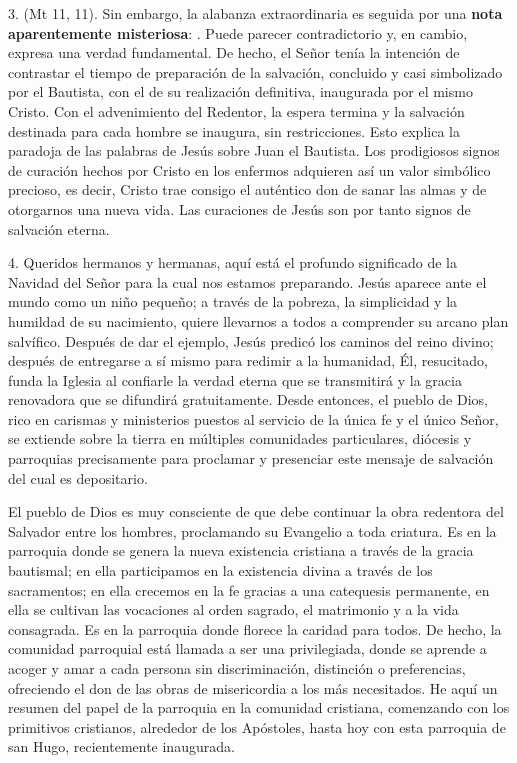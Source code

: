 3.  (Mt 11, 11). Sin embargo, la alabanza extraordinaria es seguida por una \textbf{nota aparentemente misteriosa}: . Puede parecer contradictorio y, en cambio, expresa una verdad fundamental. De hecho, el Señor tenía la intención de contrastar el tiempo de preparación de la salvación, concluido y casi simbolizado por el Bautista, con el de su realización definitiva, inaugurada por el mismo Cristo. Con el advenimiento del Redentor, la espera termina y la salvación destinada para cada hombre se inaugura, sin restricciones. Esto explica la paradoja de las palabras de Jesús sobre Juan el Bautista. Los prodigiosos signos de curación hechos por Cristo en los enfermos adquieren así un valor simbólico precioso, es decir, Cristo trae consigo el auténtico don de sanar las almas y de otorgarnos una nueva vida. Las curaciones de Jesús son por tanto signos de salvación eterna.

4. Queridos hermanos y hermanas, aquí está el profundo significado de la Navidad del Señor para la cual nos estamos preparando. Jesús aparece ante el mundo como un niño pequeño; a través de la pobreza, la simplicidad y la humildad de su nacimiento, quiere llevarnos a todos a comprender su arcano plan salvífico. Después de dar el ejemplo, Jesús predicó los caminos del reino divino; después de entregarse a sí mismo para redimir a la humanidad, Él, resucitado, funda la Iglesia al confiarle la verdad eterna que se transmitirá y la gracia renovadora que se difundirá gratuitamente. Desde entonces, el pueblo de Dios, rico en carismas y ministerios puestos al servicio de la única fe y el único Señor, se extiende sobre la tierra en múltiples comunidades particulares, diócesis y parroquias precisamente para proclamar y presenciar este mensaje de salvación del cual es depositario.

El pueblo de Dios es muy consciente de que debe continuar la obra redentora del Salvador entre los hombres, proclamando su Evangelio a toda criatura. Es en la parroquia donde se genera la nueva existencia cristiana a través de la gracia bautismal; en ella participamos en la existencia divina a través de los sacramentos; en ella crecemos en la fe gracias a una catequesis permanente, en ella se cultivan las vocaciones al orden sagrado, el matrimonio y a la vida consagrada. Es en la parroquia donde florece la caridad para todos. De hecho, la comunidad parroquial está llamada a ser una  privilegiada, donde se aprende a acoger y amar a cada persona sin discriminación, distinción o preferencias, ofreciendo el don de las obras de misericordia a los más necesitados. He aquí un resumen del papel de la parroquia en la comunidad cristiana, comenzando con los primitivos cristianos, alrededor de los Apóstoles, hasta hoy con esta parroquia de san Hugo, recientemente inaugurada.

